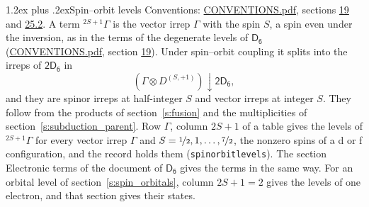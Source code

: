 \documentclass[10pt,a4paper]{article}
\makeatletter
\renewcommand\section{\@startsection{section}{1}{\z@}{-3ex plus -1ex minus -.2ex}%
  {1.2ex plus .2ex}{\normalfont\large\sffamily\bfseries\color{parttitle}}}
\numberwithin{equation}{section}
\newcommand{\grp}[1]{\mathsf{#1}}
\newcommand{\restr}[2]{#1\!\downarrow#2}
\newcommand{\irrJp}[2]{D^{(#1,#2)}}
\newcommand{\irrprod}{\otimes}
\newcommand{\term}[2]{{}^{#1}#2}
\makeatother
\begin{document}
\section{Spin--orbit levels}\label{s:spin_orbit}
Conventions: \href{../../CONVENTIONS.pdf}{CONVENTIONS.pdf}, sections \href{../../../rotation/CONVENTIONS.pdf\#conv.19}{19} and \href{../../CONVENTIONS.pdf\#conv.25.2}{25.2}.
\leavevmode\label{n:local.spin}\label{n:symbol.term}A term $\term{2S+1}{\Gamma}$ is the vector irrep $\Gamma$ with the spin $S$, a spin even under the inversion, as in the terms of the degenerate levels of \href{../../../rotation/data/pdf/D6.pdf}{$\grp{D_{6}}$} (\href{../../CONVENTIONS.pdf}{CONVENTIONS.pdf}, section \href{../../../rotation/CONVENTIONS.pdf\#conv.19}{19}). Under spin--orbit coupling it splits into the irreps of $\grp{2D_{6}}$ in
\begin{equation}\label{e:spinorbit}\restr{(\Gamma \irrprod \irrJp{S}{+1})}{\grp{2D_{6}}},\end{equation}
and they are spinor irreps at half-integer $S$ and vector irreps at integer $S$. They follow from the products of section~\ref{s:fusion} and the multiplicities of section~\ref{s:subduction_parent}. Row $\Gamma$, column $2S + 1$ of a table gives the levels of $\term{2S+1}{\Gamma}$ for every vector irrep $\Gamma$ and $S = \nicefrac{1}{2}, 1, \dots, \nicefrac{7}{2}$, the nonzero spins of a d or f configuration, and the record holds them (\texttt{spinorbitlevels}). The section Electronic terms of the document of \href{../../../rotation/data/pdf/D6.pdf}{$\grp{D_{6}}$} gives the terms in the same way. For an orbital level of section~\ref{s:spin_orbitals}, column $2S + 1 = 2$ gives the levels of one electron, and that section gives their states.
\end{document}
